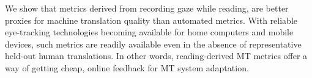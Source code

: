 We show that metrics derived from recording gaze while reading, are better proxies for machine translation quality than automated metrics. With reliable eye-tracking technologies becoming available for home computers and mobile devices, such metrics are readily available even in the absence of representative held-out human translations. In other words, reading-derived MT metrics offer a way of getting cheap, online feedback for MT system adaptation.
